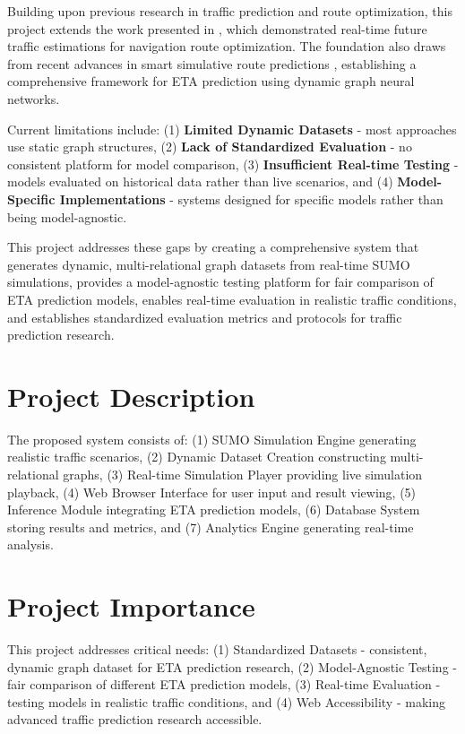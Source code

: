 \documentclass[12pt,a4paper]{article}
\begin{document}
Building upon previous research in traffic prediction and route optimization, this project extends the work presented in \cite{voloch2021}, which demonstrated real-time future traffic estimations for navigation route optimization. The foundation also draws from recent advances in smart simulative route predictions \cite{SmartSimulativeRoute2025}, establishing a comprehensive framework for ETA prediction using dynamic graph neural networks.

Current limitations include: (1) \textbf{Limited Dynamic Datasets} - most approaches use static graph structures, (2) \textbf{Lack of Standardized Evaluation} - no consistent platform for model comparison, (3) \textbf{Insufficient Real-time Testing} - models evaluated on historical data rather than live scenarios, and (4) \textbf{Model-Specific Implementations} - systems designed for specific models rather than being model-agnostic.

This project addresses these gaps by creating a comprehensive system that generates dynamic, multi-relational graph datasets from real-time SUMO simulations, provides a model-agnostic testing platform for fair comparison of ETA prediction models, enables real-time evaluation in realistic traffic conditions, and establishes standardized evaluation metrics and protocols for traffic prediction research.

\section{Project Description}

The proposed system consists of: (1) SUMO Simulation Engine generating realistic traffic scenarios, (2) Dynamic Dataset Creation constructing multi-relational graphs, (3) Real-time Simulation Player providing live simulation playback, (4) Web Browser Interface for user input and result viewing, (5) Inference Module integrating ETA prediction models, (6) Database System storing results and metrics, and (7) Analytics Engine generating real-time analysis.

\section{Project Importance}

This project addresses critical needs: (1) Standardized Datasets - consistent, dynamic graph dataset for ETA prediction research, (2) Model-Agnostic Testing - fair comparison of different ETA prediction models, (3) Real-time Evaluation - testing models in realistic traffic conditions, and (4) Web Accessibility - making advanced traffic prediction research accessible.
\end{document}
